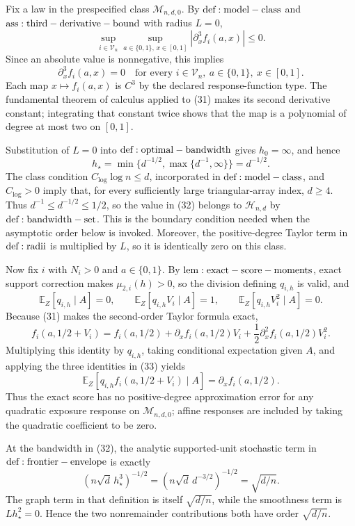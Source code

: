Fix a law in the prespecified class \(\mathcal M_{n,d,0}\).  By \({\rm def:model-class}\) and \({\rm ass:third-derivative-bound}\) with radius \(L=0\),
\[
 \sup_{i\in\mathcal V_n}\sup_{a\in\{0,1\},\,x\in[0,1]}
 |\partial_x^3 f_i(a,x)|\leq 0.
\]
Since an absolute value is nonnegative, this implies
\[
 \partial_x^3 f_i(a,x)=0
 \quad\text{for every }i\in\mathcal V_n,
 \ a\in\{0,1\},\ x\in[0,1].
\tag{31}
\]
Each map \(x\mapsto f_i(a,x)\) is \(C^3\) by the declared response-function type.  The fundamental theorem of calculus applied to (31) makes its second derivative constant; integrating that constant twice shows that the map is a polynomial of degree at most two on \([0,1]\).

Substitution of \(L=0\) into \({\rm def:optimal-bandwidth}\) gives \(h_0=\infty\), and hence
\[
 h_\star
 =\min\{d^{-1/2},\max\{d^{-1},\infty\}\}
 =d^{-1/2}.
\tag{32}
\]
The class condition \(C_{\log}\log n\leq d\), incorporated in \({\rm def:model-class}\), and \(C_{\log}>0\) imply that, for every sufficiently large triangular-array index, \(d\geq4\).  Thus \(d^{-1}\leq d^{-1/2}\leq1/2\), so the value in (32) belongs to \(\mathcal H_{n,d}\) by \({\rm def:bandwidth-set}\).  This is the boundary condition needed when the asymptotic order below is invoked.  Moreover, the positive-degree Taylor term in \({\rm def:radii}\) is multiplied by \(L\), so it is identically zero on this class.

Now fix \(i\) with \(N_i>0\) and \(a\in\{0,1\}\).  By \({\rm lem:exact-score-moments}\), exact support correction makes \(\mu_{2,i}(h)>0\), so the division defining \(q_{i,h}\) is valid, and
\[
 \mathbb E_Z[q_{i,h}\mid A]=0,
 \qquad
 \mathbb E_Z[q_{i,h}V_i\mid A]=1,
 \qquad
 \mathbb E_Z[q_{i,h}V_i^2\mid A]=0.
\tag{33}
\]
Because (31) makes the second-order Taylor formula exact,
\[
 f_i(a,1/2+V_i)
 =f_i(a,1/2)+\partial_xf_i(a,1/2)V_i
  +\frac12\partial_x^2f_i(a,1/2)V_i^2.
\]
Multiplying this identity by \(q_{i,h}\), taking conditional expectation given \(A\), and applying the three identities in (33) yields
\[
 \mathbb E_Z\!\left[q_{i,h}f_i(a,1/2+V_i)\mid A\right]
 =\partial_xf_i(a,1/2).
\]
Thus the exact score has no positive-degree approximation error for any quadratic exposure response on \(\mathcal M_{n,d,0}\); affine responses are included by taking the quadratic coefficient to be zero.

At the bandwidth in (32), the analytic supported-unit stochastic term in \({\rm def:frontier-envelope}\) is exactly
\[
 (n\sqrt d\,h_\star^3)^{-1/2}
 =(n\sqrt d\,d^{-3/2})^{-1/2}
 =\sqrt{d/n}.
\tag{34}
\]
The graph term in that definition is itself \(\sqrt{d/n}\), while the smoothness term is \(Lh_\star^2=0\).  Hence the two nonremainder contributions both have order \(\sqrt{d/n}\).


